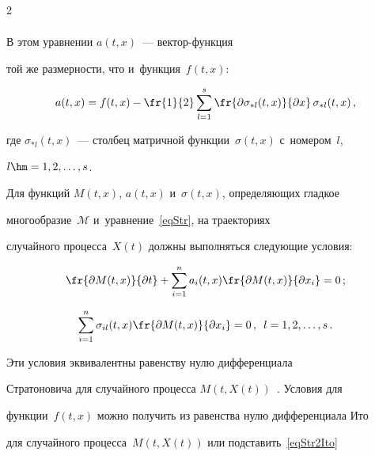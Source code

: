 \begin{multicols}{2}
\begin{multline}
\end{multline}

В этом уравнении $a(t,x)$~--- век\-тор-функ\-ция 

той же размерности, что и~функция~$f(t,x)$:

\begin{equation}

\label{eqStr2Ito}

  a(t,x) = f(t,x) - \fr{1}{2} \sum\limits_{l = 1}^s 

  {\fr{\partial \sigma_{* l}(t,x)}{\partial x} \, \sigma_{* l}(t,x)}\,,

\end{equation}

где $\sigma_{* l}(t,x)$~--- столбец матричной функции~$\sigma(t,x)$ с~номером~$l$, 

$l \hm= 1,2,\dots,s$.



Для функций $M(t,x)$, $a(t,x)$ и~$\sigma(t,x)$, определяющих гладкое 

многообразие~$\mathcal{M}$ и~уравнение~\eqref{eqStr}, на траекториях 

случайного процесса~$X(t)$ должны выполняться следующие условия:

\begin{equation}

\label{eqCondition1}

  \fr{\partial M(t,x)}{\partial t} + \sum\limits_{i=1}^n a_i(t,x)  

  \fr{\partial M(t,x)}{\partial x_i} = 0\,;

\end{equation}

\begin{equation}

\label{eqCondition2}

  \sum\limits_{i=1}^n \sigma_{il}(t,x) 

   \fr{\partial M(t,x)}{\partial x_i} = 0\,, \enskip l = 1,2,\dots,s\,.

\end{equation}



Эти условия эквивалентны равенству нулю дифференциала 

Стратоновича для случайного процесса $M(t,X(t))$~\cite{Dub_12}. Условия для 

функции~$f(t,x)$ можно получить из равенства нулю дифференциала Ито 

для случайного процесса~$M(t,X(t))$ или подставить~\eqref{eqStr2Ito} 


\end{multicols}
